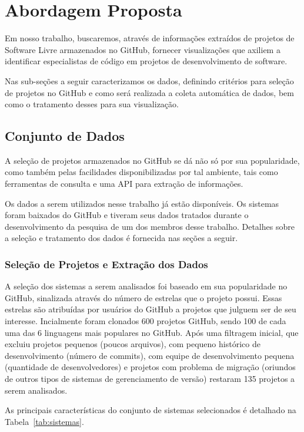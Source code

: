 \documentclass[12pt]{article}
\begin{document}
\section{Abordagem Proposta}
Em nosso trabalho, buscaremos, através de informações extraídos de projetos de Software Livre armazenados no GitHub, fornecer visualizações que axiliem a identificar especialistas de código em projetos de desenvolvimento de software. 

Nas sub-seções a seguir caracterizamos os dados, definindo critérios para seleção de projetos no GitHub e como será realizada a coleta automática de dados, bem como o tratamento desses para sua visualização.

\subsection{Conjunto de Dados}
A seleção de projetos armazenados no GitHub se dá não só por sua popularidade, como também pelas facilidades disponibilizadas por tal ambiente, tais como ferramentas de consulta e uma API para extração de informações.

Os dados a serem utilizados nesse trabalho já estão disponíveis. Os sistemas foram baixados do GitHub e tiveram seus dados tratados durante o desenvolvimento da pesquisa de um dos membros desse trabalho. Detalhes sobre a seleção e tratamento dos dados é fornecida nas seções a seguir. 

\subsubsection {Seleção de Projetos e Extração dos Dados}
A seleção dos sistemas a serem analisados foi baseado em sua popularidade no GitHub, sinalizada através do número de estrelas que o projeto possui. Essas estrelas são atribuídas por usuários do GitHub a projetos que julguem ser de seu interesse. Incialmente foram clonados 600 projetos GitHub, sendo 100 de cada uma das 6 linguagens mais populares no GitHub. Após uma filtragem inicial, que excluiu projetos pequenos (poucos arquivos),  com pequeno histórico de desenvolvimento (número de commits), com equipe de desenvolvimento pequena (quantidade de desenvolvedores) e projetos com problema de migração (oriundos de outros tipos de sistemas de gerenciamento de versão) restaram 135 projetos a serem analisados.

As principais características do  conjunto de sistemas selecionados é detalhado na Tabela~\ref{tab:sistemas}.
\end{document}
